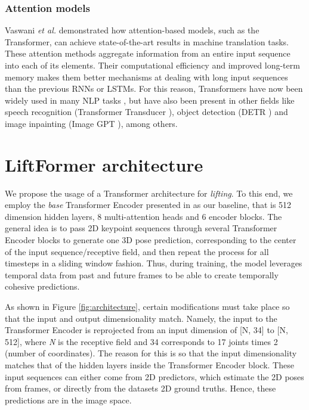 \documentclass[letterpaper]{article}
\begin{document}
\subsubsection{Attention models}
Vaswani \textit{et al.} \cite{vaswani17} demonstrated how attention-based \cite{bahdanau14} models, such as the Transformer, can achieve state-of-the-art results in machine translation tasks. These attention methods aggregate information from an entire input sequence into each of its elements. Their computational efficiency and improved long-term memory makes them better mechanisms at dealing with long input sequences than the previous RNNs or LSTMs. For this reason, Transformers have now been widely used in many NLP tasks \cite{devlin18, lan19}, but have also been present in other fields like speech recognition (Transformer Transducer \cite{zhang20}), object detection (DETR \cite{carion20}) and image inpainting (Image GPT \cite{chen20}), among others.

\section{LiftFormer architecture}
We propose the usage of a Transformer architecture for \textit{lifting}. To this end, we employ the \textit{base} Transformer Encoder presented in \cite{vaswani17} as our baseline, that is 512 dimension hidden layers, 8 multi-attention heads and 6 encoder blocks. The general idea is to pass 2D keypoint sequences through several Transformer Encoder blocks to generate one 3D pose prediction, corresponding to the center of the input sequence/receptive field, and then repeat the process for all timesteps in a sliding window fashion. Thus, during training, the model leverages temporal data from past and future frames to be able to create temporally cohesive predictions.

As shown in Figure \ref{fig:architecture}, certain modifications must take place so that the input and output dimensionality match. Namely, the input to the Transformer Encoder is reprojected from an input dimension of [N, 34] to [N, 512], where \textit{N} is the receptive field and 34 corresponds to 17 joints times 2 (number of coordinates). The reason for this is so that the input dimensionality matches that of the hidden layers inside the Transformer Encoder block. These input sequences can either come from 2D predictors, which estimate the 2D poses from frames, or directly from the datasets 2D ground truths. Hence, these predictions are in the image space.
\end{document}
